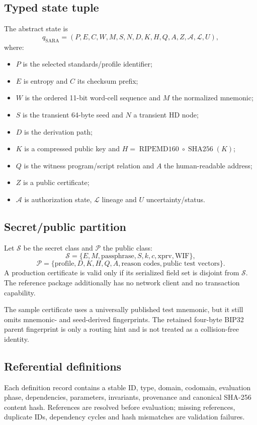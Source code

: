 \documentclass[10pt,a4paper]{article}
\newcommand{\HashOneSixty}{\operatorname{RIPEMD160}\!\circ\!\operatorname{SHA256}}
\begin{document}
\subsection{Typed state tuple}
The abstract state is
\[
q_{\mathrm{SARA}}=(P,E,C,W,M,S,N,D,K,H,Q,A,Z,\mathcal A,\mathcal L,U),
\]
where:
\begin{itemize}
\item $P$ is the selected standards/profile identifier;
\item $E$ is entropy and $C$ its checksum prefix;
\item $W$ is the ordered 11-bit word-cell sequence and $M$ the normalized mnemonic;
\item $S$ is the transient 64-byte seed and $N$ a transient HD node;
\item $D$ is the derivation path;
\item $K$ is a compressed public key and $H=\HashOneSixty(K)$;
\item $Q$ is the witness program/script relation and $A$ the human-readable address;
\item $Z$ is a public certificate;
\item $\mathcal A$ is authorization state, $\mathcal L$ lineage and $U$ uncertainty/status.
\end{itemize}

\subsection{Secret/public partition}
\begin{definitionbox}
Let $\mathcal S$ be the secret class and $\mathcal P$ the public class:
\[
\mathcal S=\{E,M,\text{passphrase},S,k,c,\text{xprv},\text{WIF}\},
\]
\[
\mathcal P=\{\text{profile},D,K,H,Q,A,\text{reason codes},\text{public test vectors}\}.
\]
A production certificate is valid only if its serialized field set is disjoint from $\mathcal S$. The reference package additionally has no network client and no transaction capability.
\end{definitionbox}

The sample certificate uses a universally published test mnemonic, but it still omits mnemonic- and seed-derived fingerprints. The retained four-byte BIP32 parent fingerprint is only a routing hint and is not treated as a collision-free identity.

\subsection{Referential definitions}
Each definition record contains a stable ID, type, domain, codomain, evaluation phase, dependencies, parameters, invariants, provenance and canonical SHA-256 content hash. References are resolved before evaluation; missing references, duplicate IDs, dependency cycles and hash mismatches are validation failures.
\end{document}
